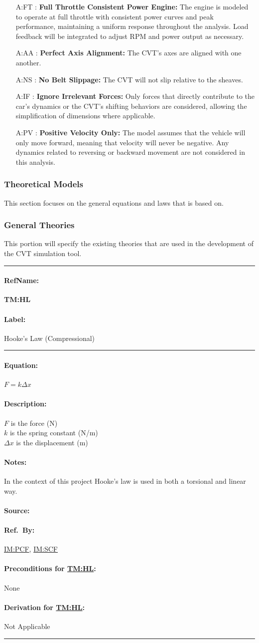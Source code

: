 \documentclass[12pt]{article}
\newcommand{\hpref}[1]{\hyperref[#1]{#1}}
\newcommand{\deftheory}[9][Not Applicable]
{
\newpage
\noindent \rule{\textwidth}{0.5mm}

\paragraph{RefName: } \textbf{#2} \phantomsection 
\label{#2}

\paragraph{Label:} #3

\noindent \rule{\textwidth}{0.5mm}

\paragraph{Equation:}

#4

\paragraph{Description:}

#5

\paragraph{Notes:}

#6

\paragraph{Source:}

#7

\paragraph{Ref.\ By:}

#8

\paragraph{Preconditions for \hpref{#2}:}
\label{#2_precond}

#9

\paragraph{Derivation for \hpref{#2}:}
\label{#2_deriv}

#1

\noindent \rule{\textwidth}{0.5mm}

}
\begin{document}
\begin{itemize}
\item[A:FT \label{A:FT}:]
\textbf{Full Throttle Consistent Power Engine:} The engine is modeled to operate at full throttle with consistent power curves and peak performance, maintaining a uniform response throughout the analysis. Load feedback will be integrated to adjust RPM and power output as necessary.

\item[A:AA \label{A:AA}:]
\textbf{Perfect Axis Alignment:} The CVT's axes are aligned with one another.

\item[A:NS \label{A:NS}:]
\textbf{No Belt Slippage:} The CVT will not slip relative to the sheaves.

\item[A:IF \label{A:IF}:]
\textbf{Ignore Irrelevant Forces:} Only forces that directly contribute to the car's dynamics or the CVT's shifting behaviors are considered, allowing the simplification of dimensions where applicable.

\item[A:PV \label{A:PV}:]
\textbf{Positive Velocity Only:} The model assumes that the vehicle will only move forward, meaning that velocity will never be negative. Any dynamics related to reversing or backward movement are not considered in this analysis.


\end{itemize}

\subsubsection{Theoretical Models}\label{sec_theoretical}

This section focuses on the general equations and laws that \progname{} is based
on. 
\subsubsection*{General Theories}
This portion will specify the existing theories that are used in the development of the CVT simulation tool.

\noindent
\deftheory
{TM:HL}%
{Hooke's Law (Compressional)}%
{$F = k \Delta x$}%
{$F$ is the force (N)\\
  $k$ is the spring constant (N/m)\\
  $\Delta x$ is the displacement (m)}%
{In the context of this project Hooke's law is used in both a torsional and linear way.}%
{\citet{hookeslaw}}
{\hpref{IM:PCF}, \hpref{IM:SCF}}%
{None}%
{}%
\end{document}
